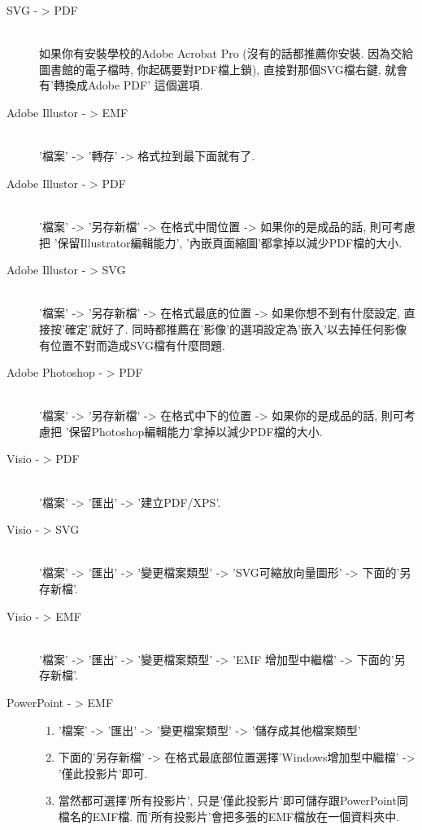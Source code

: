 \begin{description}
  \item[SVG - > PDF] \hfill\\
    如果你有安裝學校的Adobe Acrobat Pro (沒有的話都推薦你安裝. 因為交給圖書館的電子檔時, 你起碼要對PDF檔上鎖), 直接對那個SVG檔右鍵, 就會有'轉換成Adobe PDF' 這個選項.

  \item[Adobe Illustor - > EMF] \hfill\\
    '檔案' -> '轉存' -> 格式拉到最下面就有了.

  \item[Adobe Illustor - > PDF] \hfill\\
    '檔案' -> '另存新檔' -> 在格式中間位置 -> 如果你的是成品的話, 則可考慮把 '保留Illustrator編輯能力', '內嵌頁面縮圖'都拿掉以減少PDF檔的大小.

  \item[Adobe Illustor - > SVG] \hfill\\
    '檔案' -> '另存新檔' -> 在格式最底的位置 -> 如果你想不到有什麼設定, 直接按'確定'就好了. 同時都推薦在'影像'的選項設定為'嵌入'以去掉任何影像有位置不對而造成SVG檔有什麼問題.

  \item[Adobe Photoshop - > PDF] \hfill\\
    '檔案' -> '另存新檔' -> 在格式中下的位置 -> 如果你的是成品的話, 則可考慮把 '保留Photoshop編輯能力'拿掉以減少PDF檔的大小.

  \item[Visio - > PDF] \hfill\\
    '檔案' -> '匯出' -> '建立PDF/XPS'.

  \item[Visio - > SVG] \hfill\\
    '檔案' -> '匯出' -> '變更檔案類型' -> 'SVG可縮放向量圖形' -> 下面的'另存新檔'.

  \item[Visio - > EMF] \hfill\\
    '檔案' -> '匯出' -> '變更檔案類型' -> 'EMF 增加型中繼檔' -> 下面的'另存新檔'.

  \newpage
  \item[PowerPoint - > EMF] \hfill
    \begin{enumerate}
      \item '檔案' -> '匯出' -> '變更檔案類型' -> '儲存成其他檔案類型'
      \item 下面的'另存新檔' -> 在格式最底部位置選擇'Windows增加型中繼檔' -> '僅此投影片'即可.
      \item 當然都可選擇'所有投影片', 只是'僅此投影片'即可儲存跟PowerPoint同檔名的EMF檔. 而'所有投影片'會把多張的EMF檔放在一個資料夾中.
    \end{enumerate}


\end{description}
